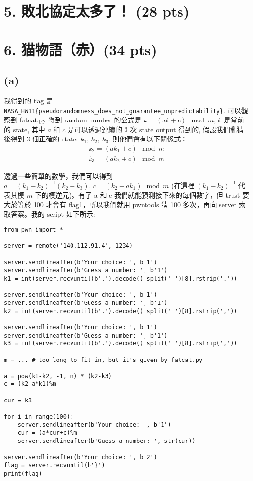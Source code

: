 \documentclass[12pt]{article}
\begin{document}
\newpage
\section*{5. 敗北協定太多了！ (28 pts)}

\newpage
\section*{6. 猫物語（赤）(34 pts)}
\subsection*{(a)}
我得到的 flag 是: \verb|NASA_HW11{pseudorandomness_does_not_guarantee_unpredictability}|. 可以觀察到 fatcat.py 得到 random number 的公式是 $k=(ak+c)\mod{m}$, $k$ 是當前的 state, 其中 $a$ 和 $c$ 是可以透過連續的 3 次 state output 得到的, 假設我們亂猜後得到 3 個正確的 state: $k_1,\ k_2,\ k_3$. 則他們會有以下關係式：
\begin{align*}
    k_2=(ak_1+c)\mod{m} \\
    k_3=(ak_2+c)\mod{m}
\end{align*}

透過一些簡單的數學，我們可以得到 $a=(k_1-k_2)^{-1}(k_2-k_3),\ c=(k_2-ak_1)\mod{m}$ (在這裡 $(k_1-k_2)^{-1}$ 代表其模 $m$ 下的模逆元)。有了 a 和 c 我們就能預測接下來的每個數字，但 trust 要大於等於 100 才會有 flag1，所以我們就用 pwntools 猜 100 多次，再向 server 索取答案。我的 script 如下所示:
\begin{verbatim}
from pwn import *

server = remote('140.112.91.4', 1234)

server.sendlineafter(b'Your choice: ', b'1')
server.sendlineafter(b'Guess a number: ', b'1')
k1 = int(server.recvuntil(b'.').decode().split(' ')[8].rstrip(','))

server.sendlineafter(b'Your choice: ', b'1')
server.sendlineafter(b'Guess a number: ', b'1')
k2 = int(server.recvuntil(b'.').decode().split(' ')[8].rstrip(','))

server.sendlineafter(b'Your choice: ', b'1')
server.sendlineafter(b'Guess a number: ', b'1')
k3 = int(server.recvuntil(b'.').decode().split(' ')[8].rstrip(','))

m = ... # too long to fit in, but it's given by fatcat.py

a = pow(k1-k2, -1, m) * (k2-k3)
c = (k2-a*k1)%m

cur = k3

for i in range(100):
    server.sendlineafter(b'Your choice: ', b'1')
    cur = (a*cur+c)%m
    server.sendlineafter(b'Guess a number: ', str(cur))

server.sendlineafter(b'Your choice: ', b'2')
flag = server.recvuntil(b'}')
print(flag)
\end{verbatim}
\end{document}
